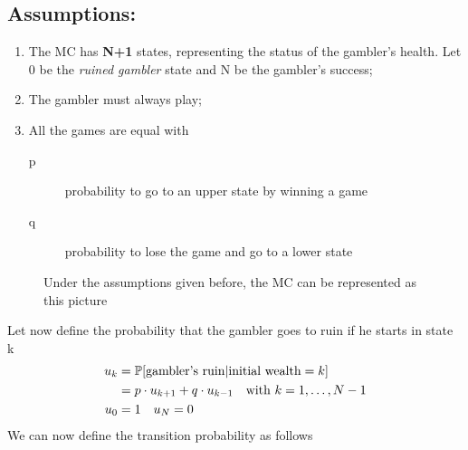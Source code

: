 \subsection{Assumptions:}
\begin{enumerate}
	\item The MC has \textbf{N+1} states, representing the status of the gambler's health.
	 Let 0 be the \textit{ruined gambler} state and N be the gambler's success;
	\item The gambler must always play;
	\item All the games are equal with
	\begin{description}
		\item[p] probability to go to an upper state by winning a game
		\item[q] probability to lose the game and go to a lower state
	\end{description}
\end{enumerate}
\begin{figure}[h]
	
	\caption{Under the assumptions given before, the MC can be represented as this picture}
\end{figure}

Let now define the probability that the gambler goes to ruin if he starts in state k
\begin{equation}\begin{split}
	u_k &= \mathbb{P}[\text{gambler's ruin}|\text{initial wealth}=k] \\
	&=p \cdot u_{k+1} + q \cdot u_{k-1} \quad \text{with }k=1, \dots, N-1 \\
	u_0 &= 1 \quad u_N = 0
\end{split}\label{eq:defUk}
\end{equation}
We can now define the transition probability as follows

